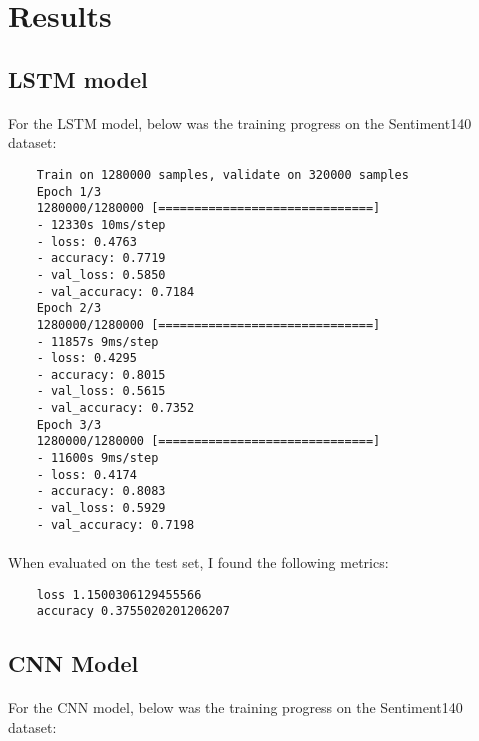\documentclass{article}
\begin{document}
\section{Results}

\subsection{LSTM model}

\paragraph{} For the LSTM model, below was the training progress on the Sentiment140 dataset:

\begin{verbatim}
    Train on 1280000 samples, validate on 320000 samples
    Epoch 1/3
    1280000/1280000 [==============================] 
    - 12330s 10ms/step 
    - loss: 0.4763
    - accuracy: 0.7719
    - val_loss: 0.5850
    - val_accuracy: 0.7184
    Epoch 2/3
    1280000/1280000 [==============================]
    - 11857s 9ms/step
    - loss: 0.4295
    - accuracy: 0.8015
    - val_loss: 0.5615
    - val_accuracy: 0.7352
    Epoch 3/3
    1280000/1280000 [==============================]
    - 11600s 9ms/step
    - loss: 0.4174
    - accuracy: 0.8083
    - val_loss: 0.5929
    - val_accuracy: 0.7198
\end{verbatim}

\paragraph{} When evaluated on the test set, I found the following metrics:

\begin{verbatim}
    loss 1.1500306129455566
    accuracy 0.3755020201206207
\end{verbatim}

\subsection{CNN Model}

\paragraph{} For the CNN model, below was the training progress on the Sentiment140 dataset:
\end{document}
